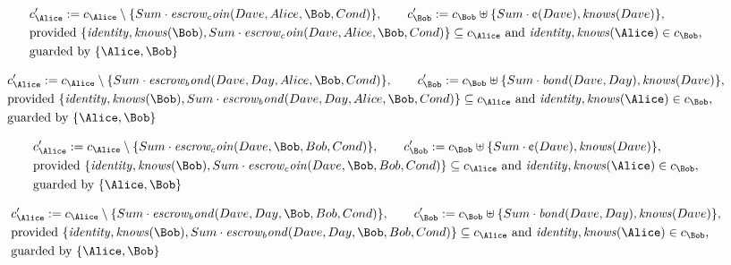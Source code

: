 \begin{align*}
&
c'_
{
\Alice
}
 := 
c_
{
\Alice
}
 \setminus 
\{
Sum
\cdot
\mathit{
escrow_coin
}
(
Dave
,
Alice
,
\Bob
,
Cond
)
\}
, \qquad 
c'_
{
\Bob
}
 := 
c_
{
\Bob
}
 \uplus 
\{
Sum
\cdot
\text{\textcent}
(
Dave
)
,
\mathit{
knows
}
(
Dave
)
\}
,\\
&
\text{provided } 
\{
\mathit{
identity
}
,
\mathit{
knows
}
(
\Bob
)
,
Sum
\cdot
\mathit{
escrow_coin
}
(
Dave
,
Alice
,
\Bob
,
Cond
)
\}
 \subseteq c_
{
\Alice
}
 \text{ and } 
\mathit{
identity
}
,
\mathit{
knows
}
(
\Alice
)
 \in c_
{
\Bob
}
,\\
&
\text{guarded by } \{
\Alice
,
\Bob
\}
\end{align*}

\begin{align*}
&
c'_
{
\Alice
}
 := 
c_
{
\Alice
}
 \setminus 
\{
Sum
\cdot
\mathit{
escrow_bond
}
(
Dave
,
Day
,
Alice
,
\Bob
,
Cond
)
\}
, \qquad 
c'_
{
\Bob
}
 := 
c_
{
\Bob
}
 \uplus 
\{
Sum
\cdot
\mathit{
bond
}
(
Dave
,
Day
)
,
\mathit{
knows
}
(
Dave
)
\}
,\\
&
\text{provided } 
\{
\mathit{
identity
}
,
\mathit{
knows
}
(
\Bob
)
,
Sum
\cdot
\mathit{
escrow_bond
}
(
Dave
,
Day
,
Alice
,
\Bob
,
Cond
)
\}
 \subseteq c_
{
\Alice
}
 \text{ and } 
\mathit{
identity
}
,
\mathit{
knows
}
(
\Alice
)
 \in c_
{
\Bob
}
,\\
&
\text{guarded by } \{
\Alice
,
\Bob
\}
\end{align*}

\begin{align*}
&
c'_
{
\Alice
}
 := 
c_
{
\Alice
}
 \setminus 
\{
Sum
\cdot
\mathit{
escrow_coin
}
(
Dave
,
\Bob
,
Bob
,
Cond
)
\}
, \qquad 
c'_
{
\Bob
}
 := 
c_
{
\Bob
}
 \uplus 
\{
Sum
\cdot
\text{\textcent}
(
Dave
)
,
\mathit{
knows
}
(
Dave
)
\}
,\\
&
\text{provided } 
\{
\mathit{
identity
}
,
\mathit{
knows
}
(
\Bob
)
,
Sum
\cdot
\mathit{
escrow_coin
}
(
Dave
,
\Bob
,
Bob
,
Cond
)
\}
 \subseteq c_
{
\Alice
}
 \text{ and } 
\mathit{
identity
}
,
\mathit{
knows
}
(
\Alice
)
 \in c_
{
\Bob
}
,\\
&
\text{guarded by } \{
\Alice
,
\Bob
\}
\end{align*}

\begin{align*}
&
c'_
{
\Alice
}
 := 
c_
{
\Alice
}
 \setminus 
\{
Sum
\cdot
\mathit{
escrow_bond
}
(
Dave
,
Day
,
\Bob
,
Bob
,
Cond
)
\}
, \qquad 
c'_
{
\Bob
}
 := 
c_
{
\Bob
}
 \uplus 
\{
Sum
\cdot
\mathit{
bond
}
(
Dave
,
Day
)
,
\mathit{
knows
}
(
Dave
)
\}
,\\
&
\text{provided } 
\{
\mathit{
identity
}
,
\mathit{
knows
}
(
\Bob
)
,
Sum
\cdot
\mathit{
escrow_bond
}
(
Dave
,
Day
,
\Bob
,
Bob
,
Cond
)
\}
 \subseteq c_
{
\Alice
}
 \text{ and } 
\mathit{
identity
}
,
\mathit{
knows
}
(
\Alice
)
 \in c_
{
\Bob
}
,\\
&
\text{guarded by } \{
\Alice
,
\Bob
\}
\end{align*}
